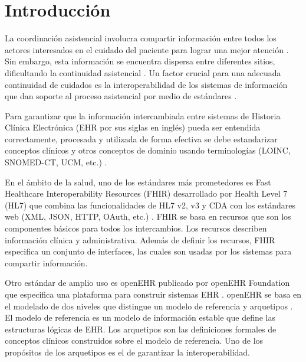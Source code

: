 \section{Introducción}

La coordinación asistencial involucra compartir información entre todos los actores interesados en el cuidado del paciente para lograr una mejor atención \cite{CareCoordination}. Sin embargo, esta información se encuentra dispersa entre diferentes sitios, dificultando la continuidad asistencial \cite{Indarte11}. Un factor crucial para una adecuada continuidad de cuidados es la interoperabilidad de los sistemas de información que dan soporte al proceso asistencial por medio de estándares \cite{OPS16}.

Para garantizar que la información intercambiada entre sistemas de Historia Clínica Electrónica (EHR por sus siglas en inglés) pueda ser entendida correctamente, procesada y utilizada de forma efectiva se debe estandarizar conceptos clínicos y otros conceptos de dominio usando terminologías (LOINC, SNOMED-CT, UCM, etc.) \cite{ISO20514}.

En el ámbito de la salud, uno de los estándares más prometedores es Fast Healthcare Interoperability Resources (FHIR) desarrollado por Health Level 7 (HL7) que combina las funcionalidades de HL7 v2, v3 y CDA con los estándares web (XML, JSON, HTTP, OAuth, etc.) \cite{FHIR}. FHIR se basa en recursos que son los componentes básicos para todos los intercambios. Los recursos describen información clínica y administrativa. Además de definir los recursos, FHIR especifica un conjunto de interfaces, las cuales son usadas por los sistemas para compartir información.

Otro estándar de amplio uso es openEHR publicado por openEHR Foundation que especifica una plataforma para construir sistemas EHR \cite{openEHR}. openEHR se basa en el modelado de dos niveles que distingue un modelo de referencia y arquetipos \cite{Bale00}. El modelo de referencia es un modelo de información estable que define las estructuras lógicas de EHR. Los arquetipos son las definiciones formales de conceptos clínicos construidos sobre el modelo de referencia. Uno de los propósitos de los arquetipos es el de garantizar la interoperabilidad.

